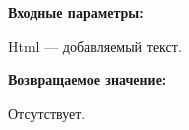 \textbf{Входные параметры:}

Html --- добавляемый текст.

\textbf{Возвращаемое значение:}

Отсутствует.